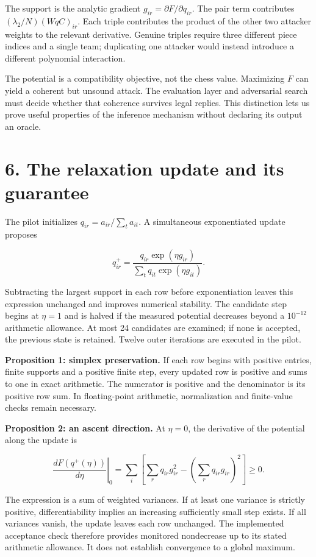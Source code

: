 \documentclass[10pt]{article}
\begin{document}
The support is the analytic gradient $g_{ir}=\partial F/\partial q_{ir}$. The pair term contributes $(\lambda_2/N)(WqC)_{ir}$. Each triple contributes the product of the other two attacker weights to the relevant derivative. Genuine triples require three different piece indices and a single team; duplicating one attacker would instead introduce a different polynomial interaction.

The potential is a compatibility objective, not the chess value. Maximizing $F$ can yield a coherent but unsound attack. The evaluation layer and adversarial search must decide whether that coherence survives legal replies. This distinction lets us prove useful properties of the inference mechanism without declaring its output an oracle.

\clearpage
\section*{6. The relaxation update and its guarantee}
The pilot initializes $q_{ir}=a_{ir}/\sum_t a_{it}$. A simultaneous exponentiated update proposes

\[
q_{ir}^{+}=\frac{q_{ir}\exp(\eta g_{ir})}
{\sum_tq_{it}\exp(\eta g_{it})}.
\]

Subtracting the largest support in each row before exponentiation leaves this expression unchanged and improves numerical stability. The candidate step begins at $\eta=1$ and is halved if the measured potential decreases beyond a $10^{-12}$ arithmetic allowance. At most 24 candidates are examined; if none is accepted, the previous state is retained. Twelve outer iterations are executed in the pilot.

\textbf{Proposition 1: simplex preservation.} If each row begins with positive entries, finite supports and a positive finite step, every updated row is positive and sums to one in exact arithmetic. The numerator is positive and the denominator is its positive row sum. In floating-point arithmetic, normalization and finite-value checks remain necessary.

\textbf{Proposition 2: an ascent direction.} At $\eta=0$, the derivative of the potential along the update is

\[
\left.\frac{dF(q^+(\eta))}{d\eta}\right|_{0}
=\sum_i\left[\sum_rq_{ir}g_{ir}^2-
\left(\sum_rq_{ir}g_{ir}\right)^2\right]\ge0.
\]

The expression is a sum of weighted variances. If at least one variance is strictly positive, differentiability implies an increasing sufficiently small step exists. If all variances vanish, the update leaves each row unchanged. The implemented acceptance check therefore provides monitored nondecrease up to its stated arithmetic allowance. It does not establish convergence to a global maximum.
\end{document}
